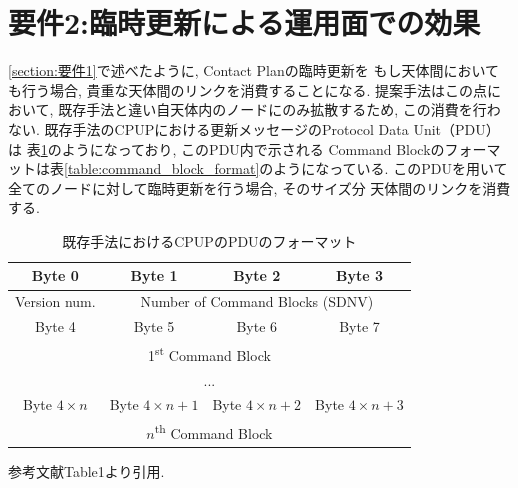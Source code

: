 \section{要件2:臨時更新による運用面での効果}
\label{section:要件2}
\ref{section:要件1}で述べたように, Contact Planの臨時更新を
もし天体間においても行う場合, 貴重な天体間のリンクを消費することになる.
提案手法はこの点において, 既存手法と違い自天体内のノードにのみ拡散するため, 
この消費を行わない. 既存手法のCPUPにおける更新メッセージのProtocol Data Unit（PDU）は
表\ref{table:cpup_pdu_format}のようになっており, このPDU内で示される
Command Blockのフォーマットは表\ref{table:command_block_format}のようになっている.
このPDUを用いて全てのノードに対して臨時更新を行う場合, そのサイズ分
天体間のリンクを消費する.

\begin{table}[htbp]
    \centering
    \caption{既存手法におけるCPUPのPDUのフォーマット}
    \label{table:cpup_pdu_format}
    \begin{tabular}{|c|c|c|c|}
      \hline
      Byte 0 & Byte 1 & Byte 2 & Byte 3 \\
      \hline
      \multicolumn{1}{|c|}{Version num.} & \multicolumn{3}{c|}{Number of Command Blocks (SDNV)} \\
      \hline
      Byte 4 & Byte 5 & Byte 6 & Byte 7 \\
      \hline
      \multicolumn{4}{|c|}{1\textsuperscript{st} Command Block} \\
      \hline
      \multicolumn{4}{|c|}{...} \\
      \hline
      Byte $4\times n$ & Byte $4\times n+1$ & Byte $4\times n+2$ & Byte $4\times n+3$ \\
      \hline
      \multicolumn{4}{|c|}{$n$\textsuperscript{th} Command Block} \\
      \hline
    \end{tabular}
    \begin{minipage}{\textwidth}
        \centering
        \vspace{3mm}
        参考文献\cite{Bezirgiannidis2013}Table1より引用.  
    \end{minipage}
  \end{table}
